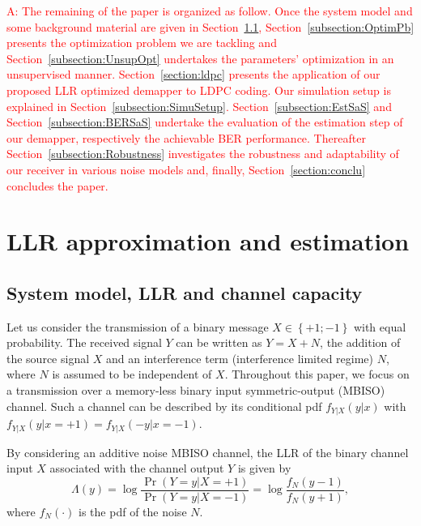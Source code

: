 \documentclass[a4paper]{IEEEtran}
\begin{document}
\textcolor{red}{A: The remaining of the paper is organized
  as follow. Once the system model and some background
  material are given in
  Section~\ref{subsection:systemModel},
  Section~\ref{subsection:OptimPb} presents the optimization
  problem we are tackling and
  Section~\ref{subsection:UnsupOpt} undertakes the
  parameters’ optimization in an unsupervised manner.
  Section~\ref{section:ldpc} presents the application of our
  proposed LLR optimized demapper to LDPC coding. Our
  simulation setup is explained in
  Section~\ref{subsection:SimuSetup}.
  Section~\ref{subsection:EstSaS} and
  Section~\ref{subsection:BERSaS} undertake the evaluation
  of the estimation step of our demapper, respectively the
  achievable BER performance. Thereafter
  Section~\ref{subsection:Robustness} investigates the
  robustness and adaptability of our receiver in various
  noise models and, finally, Section~\ref{section:conclu}
  concludes the paper.}




\section{LLR approximation and estimation}


\subsection{System model, LLR and channel capacity}
\label{subsection:systemModel}

Let us consider the transmission of a binary message $X \in
\left \{+1;-1 \right \}$ with equal probability. The
received signal $Y$ can be written as $Y = X + N$, the
addition of the source signal $X$ and an interference term
(interference limited regime) $N$, where $N$ is assumed to
be independent of $X$. Throughout this paper, we focus on
a transmission over a memory-less binary input
symmetric-output (MBISO) channel. Such a channel can be
described by its conditional pdf \(f_{Y|X}(y|x)\) with
$f_{Y|X}(y|x=+1)= f_{Y|X}(-y|x=-1)$.

By considering an additive noise MBISO channel, the LLR of
the binary channel input $X$ associated with the channel
output $Y$ is given by
\begin{equation}
  \label{eq:2}
  \Lambda(y) =
  \log\frac{\Pr(Y=y\vert X=+1)}{\Pr(Y=y\vert X=-1)}= \log\frac{f_N(y-1)}{f_N(y+1)},
\end{equation}
where $f_N(\cdot)$ is the pdf of the noise $N$.
\end{document}
